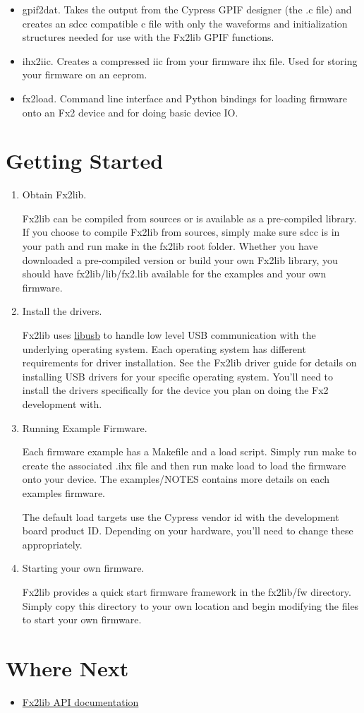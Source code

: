 \documentclass[12pt]{article}
\begin{document}
\begin{itemize}
 \item gpif2dat.  Takes the output from the Cypress GPIF designer (the .c file) and creates an sdcc compatible c file with only the waveforms and initialization structures needed for use with the Fx2lib GPIF functions.
 \item ihx2iic.  Creates a compressed iic from your firmware ihx file.  Used for storing your firmware on an eeprom.
 \item fx2load.  Command line interface and Python bindings for loading firmware onto an Fx2 device and for doing basic device IO. 
\end{itemize}

\section{Getting Started}

\begin{enumerate}
\item Obtain Fx2lib. 

 Fx2lib can be compiled from sources or is available as a pre-compiled library.
 If you choose to compile Fx2lib from sources, simply make sure sdcc is in your path and run make in the fx2lib root folder.  
 Whether you have downloaded a pre-compiled version or build your own Fx2lib library, you should have fx2lib/lib/fx2.lib available for the examples and your own firmware.
\item Install the drivers.

 Fx2lib uses \href{http://libusb.sourceforge.net}{libusb} to handle low level USB communication with the underlying operating system.
 Each operating system has different requirements for driver installation.
 See the Fx2lib driver guide for details on installing USB drivers for your specific operating system.
 You'll need to install the drivers specifically for the device you plan on doing the Fx2 development with.
 
\item Running Example Firmware. 

 Each firmware example has a Makefile and a load script.
 Simply run make to create the associated .ihx file and then run make load to load the firmware onto your device.
 The examples/NOTES contains more details on each examples firmware.

 The default load targets use the Cypress vendor id with the development board product ID.
 Depending on your hardware, you'll need to change these appropriately.
\item Starting your own firmware.

 Fx2lib provides a quick start firmware framework in the fx2lib/fw directory.
 Simply copy this directory to your own location and begin modifying the files to start your own firmware.

\end{enumerate}


\section{Where Next}

 \begin{itemize}
  \item \href{http://fx2lib.sourceforge.net/docs/}{Fx2lib API documentation}
 \end{itemize}
\end{document}
